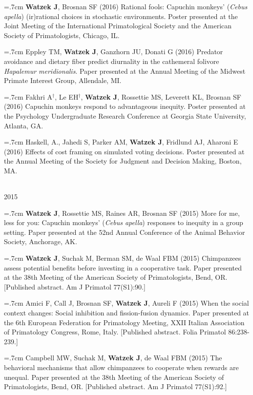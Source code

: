 \documentclass[]{friggeri-cv}
\begin{document}
\hangindent=.7cm \textbf{Watzek J}, Brosnan SF (2016) Rational fools: Capuchin monkeys' (\emph{Cebus apella}) (ir)rational choices in stochastic environments. Poster presented at the Joint Meeting of the International Primatological Society and the American Society of Primatologists, Chicago, IL.

\hangindent=.7cm Eppley TM, \textbf{Watzek J}, Ganzhorn JU, Donati G (2016) Predator avoidance and dietary fiber predict diurnality in the cathemeral folivore \emph{Hapalemur meridionalis}. Paper presented at the Annual Meeting of the Midwest Primate Interest Group, Allendale, MI.

\hangindent=.7cm Fakhri A${}^\dagger$, Le EH${}^\dagger$, \textbf{Watzek J}, Rossettie MS, Leverett KL, Brosnan SF (2016) Capuchin monkeys respond to advantageous inequity. Poster presented at the Psychology Undergraduate Research Conference at Georgia State University, Atlanta, GA.

\hangindent=.7cm Haskell, A., Jahedi S, Parker AM, \textbf{Watzek J}, Fridlund AJ, Aharoni E (2016) Effects of cost framing on simulated voting decisions. Poster presented at the Annual Meeting of the Society for Judgment and Decision Making, Boston, MA.


{\large{} ~\\[-.15cm] 2015}

\hangindent=.7cm \textbf{Watzek J}, Rossettie MS, Raines AR, Brosnan SF (2015) More for me, less for you: Capuchin monkeys' (\emph{Cebus apella}) responses to inequity in a group setting. Paper presented at the 52nd Annual Conference of the Animal Behavior Society, Anchorage, AK.

\hangindent=.7cm \textbf{Watzek J}, Suchak M, Berman SM, de Waal FBM (2015) Chimpanzees assess potential benefits before investing in a cooperative task. Paper presented at the 38th Meeting of the American Society of Primatologists, Bend, OR. [Published abstract. Am J Primatol 77(S1):90.]

\hangindent=.7cm Amici F, Call J, Brosnan SF, \textbf{Watzek J}, Aureli F (2015) When the social context changes: Social inhibition and fission-fusion dynamics. Paper presented at the 6th European Federation for Primatology Meeting, XXII Italian Association of Primatology Congress, Rome, Italy. [Published abstract. Folia Primatol 86:238-239.]

\hangindent=.7cm Campbell MW, Suchak M, \textbf{Watzek J}, de Waal FBM (2015) The behavioral mechanisms that allow chimpanzees to cooperate when rewards are unequal. Paper presented at the 38th Meeting of the American Society of Primatologists, Bend, OR. [Published abstract. Am J Primatol 77(S1):92.]
\end{document}
